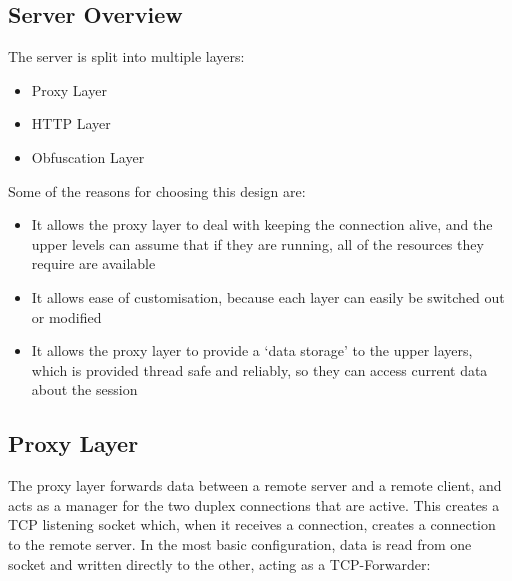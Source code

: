 \subsection{Server Overview}
The server is split into multiple layers:
\begin{itemize}
    \item Proxy Layer
    \item HTTP Layer
    \item Obfuscation Layer
\end{itemize}
Some of the reasons for choosing this design are:
\begin{itemize}
    \item It allows the proxy layer to deal with keeping the connection alive, and the upper levels can assume that if they are running, all of the resources they require are available
    \item It allows ease of customisation, because each layer can easily be switched out or modified
    \item It allows the proxy layer to provide a `data storage' to the upper layers, which is provided thread safe and reliably, so they can access current data about the session
\end{itemize}


\subsection{Proxy Layer}
The proxy layer forwards data between a remote server and a remote client, and acts as a manager for the two duplex connections that are active. This creates a TCP listening socket which, when it receives a connection, creates a connection to the remote server.
In the most basic configuration, data is read from one socket and written directly to the other, acting as a TCP-Forwarder:
\begin{center}
\end{center}

